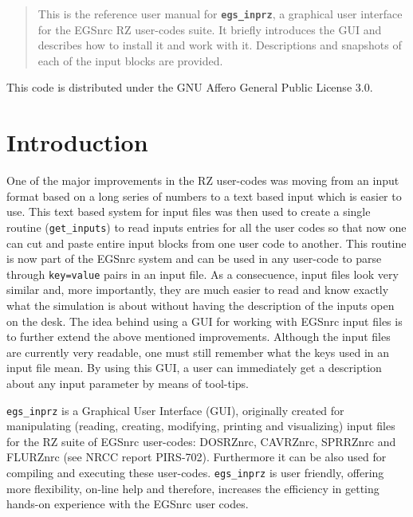 \documentclass[12pt,twoside]{article}   %
\begin{document}


\pagestyle{empty}

\pagestyle{fancy}



\newpage
\begin{abstract}

This is the reference user manual for {\bf \tt egs\_inprz}, a graphical user interface
for the EGSnrc RZ user-codes suite. It briefly introduces the GUI and describes how 
to install it and work with it. Descriptions and snapshots of each of the input blocks 
are provided.

\end{abstract}



\noindent
This code is distributed under the GNU Affero General Public License 3.0.


\tableofcontents


\newpage

\section{Introduction}

One of the major improvements in the RZ user-codes was moving from an input format
based on a long series of numbers to a text based input which is easier to use.
This text based system for input files was then used to create a single routine 
({\tt get\_inputs}) to read inputs entries for all the user codes so that now 
one can cut and paste entire input blocks from one user code to another. 
This routine is now part of the EGSnrc system and can be used in any user-code to 
parse through {\tt key=value} pairs in an input file.
As a consecuence, input files look very similar and,
more importantly, they are much easier to read and know exactly what the simulation 
is about without having the description of the inputs open on the desk. 
The idea behind using a GUI for working with EGSnrc input files is to further 
extend the above mentioned improvements. Although the input files are currently 
very readable, one must still remember what the keys used in an input file mean.
By using this GUI, a user can immediately get a description about any input parameter
by means of tool-tips.

{\tt egs\_inprz} is a Graphical User Interface (GUI), originally created for manipulating
(reading, creating, modifying, printing and visualizing) 
input files for the  RZ suite of EGSnrc  user-codes:
DOSRZnrc, CAVRZnrc, SPRRZnrc and FLURZnrc (see NRCC report PIRS-702\cite{Ro10}). 
Furthermore it can be also used for compiling and executing these user-codes. 
 {\tt egs\_inprz} is user friendly, offering more flexibility, on-line help and therefore, 
increases the efficiency in getting hands-on experience with the EGSnrc user codes.
\end{document}

